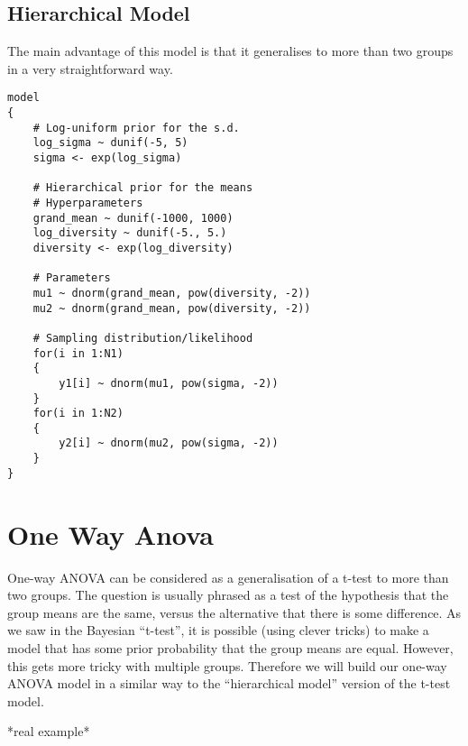 \subsection{Hierarchical Model}


The main advantage of this model is that it generalises to more than two groups
in a very straightforward way.
\begin{framed}
\begin{verbatim}
model
{
    # Log-uniform prior for the s.d.
    log_sigma ~ dunif(-5, 5)
    sigma <- exp(log_sigma)

    # Hierarchical prior for the means
    # Hyperparameters
    grand_mean ~ dunif(-1000, 1000)
    log_diversity ~ dunif(-5., 5.)
    diversity <- exp(log_diversity)

    # Parameters
    mu1 ~ dnorm(grand_mean, pow(diversity, -2))
    mu2 ~ dnorm(grand_mean, pow(diversity, -2))

    # Sampling distribution/likelihood
    for(i in 1:N1)
    {
        y1[i] ~ dnorm(mu1, pow(sigma, -2))
    }
    for(i in 1:N2)
    {
        y2[i] ~ dnorm(mu2, pow(sigma, -2))
    }
}

\end{verbatim}
\end{framed}



\section{One Way Anova}
One-way ANOVA can be considered as a generalisation of a t-test to more than
two groups. The question is usually phrased as a test of the hypothesis that
the group means are the same, versus the alternative that there is some difference.
As we saw in the Bayesian ``t-test'', it is possible (using clever tricks) to
make a model that has some prior probability that the group means are equal.
However, this gets more tricky with multiple groups. Therefore we will build our
one-way ANOVA model in a similar way to the ``hierarchical model'' version of the
t-test model.

*real example*



